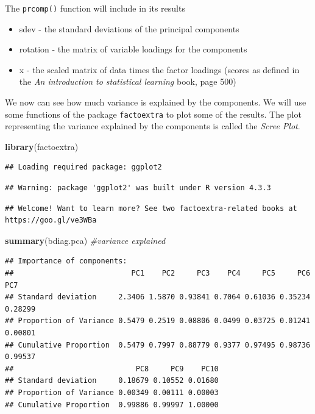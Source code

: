 \documentclass[
]{book}
\newenvironment{Shaded}{\begin{snugshade}}{\end{snugshade}}
\newcommand{\CommentTok}[1]{\textcolor[rgb]{0.56,0.35,0.01}{\textit{#1}}}
\newcommand{\FunctionTok}[1]{\textcolor[rgb]{0.13,0.29,0.53}{\textbf{#1}}}
\newcommand{\NormalTok}[1]{#1}
\providecommand{\tightlist}{%
  \setlength{\itemsep}{0pt}\setlength{\parskip}{0pt}}
\begin{document}
The \texttt{prcomp()} function will include in its results

\begin{itemize}
\tightlist
\item
  sdev - the standard deviations of the principal components
\item
  rotation - the matrix of variable loadings for the components
\item
  x - the scaled matrix of data times the factor loadings (scores as defined
  in the \emph{An introduction to statistical learning} book, page 500)
\end{itemize}

We now can see how much variance is explained by the components. We will
use some functions of the package \texttt{factoextra} to plot some of the results.
The plot representing the variance explained by the components is called the \emph{Scree Plot}.

\begin{Shaded}
\begin{Highlighting}[]
\FunctionTok{library}\NormalTok{(factoextra)}
\end{Highlighting}
\end{Shaded}

\begin{verbatim}
## Loading required package: ggplot2
\end{verbatim}

\begin{verbatim}
## Warning: package 'ggplot2' was built under R version 4.3.3
\end{verbatim}

\begin{verbatim}
## Welcome! Want to learn more? See two factoextra-related books at https://goo.gl/ve3WBa
\end{verbatim}

\begin{Shaded}
\begin{Highlighting}[]
\FunctionTok{summary}\NormalTok{(bdiag.pca) }\CommentTok{\#variance explained}
\end{Highlighting}
\end{Shaded}

\begin{verbatim}
## Importance of components:
##                           PC1    PC2     PC3    PC4     PC5     PC6     PC7
## Standard deviation     2.3406 1.5870 0.93841 0.7064 0.61036 0.35234 0.28299
## Proportion of Variance 0.5479 0.2519 0.08806 0.0499 0.03725 0.01241 0.00801
## Cumulative Proportion  0.5479 0.7997 0.88779 0.9377 0.97495 0.98736 0.99537
##                            PC8     PC9    PC10
## Standard deviation     0.18679 0.10552 0.01680
## Proportion of Variance 0.00349 0.00111 0.00003
## Cumulative Proportion  0.99886 0.99997 1.00000
\end{verbatim}
\end{document}
